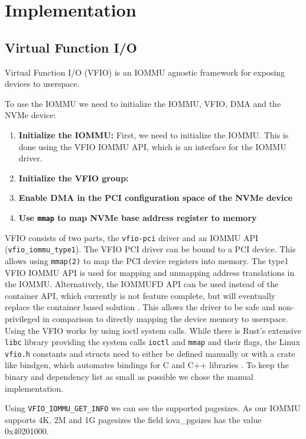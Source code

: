 \chapter{Implementation} \label{c:impl}

\section{Virtual Function I/O}
Virtual Function I/O (VFIO) is an IOMMU agnostic framework for exposing devices to userspace.

To use the IOMMU we need to initialize the IOMMU, VFIO, DMA and the NVMe device:
\begin{enumerate}
    \item \textbf{Initialize the IOMMU: } First, we need to initialize the IOMMU. This is done using the VFIO IOMMU API, which is an interface for the IOMMU driver. %
    \item \textbf{Initialize the VFIO group: }
    \item \textbf{Enable DMA in the PCI configuration space of the NVMe device}
    \item \textbf{Use \texttt{mmap} to map NVMe base address register to memory}
\end{enumerate}

VFIO consists of two parts, the \texttt{vfio-pci} driver and an IOMMU API (\texttt{vfio\_iommu\_type1}). The VFIO PCI driver can be bound to a PCI device. This allows using \texttt{mmap(2)} to map the PCI device registers into memory. The type1 VFIO IOMMU API is used for mapping and unmapping address translations in the IOMMU. Alternatively, the IOMMUFD API can be used instead of the container API, which currently is not feature complete, but will eventually replace the container based solution \cite{vfiokerneldocs}.
This allows the driver to be safe and non-privileged in comparison to directly mapping the device memory to userspace.
Using the VFIO works by using ioctl system calls.
While there is Rust's extensive \texttt{libc} library providing the system calls \texttt{ioctl} and \texttt{mmap} and their flags, the Linux \texttt{vfio.h} constants and structs need to either be defined manually or with a crate like bindgen, which automates bindings for C and C++ libraries \cite{cratebindgen}. To keep the binary and dependency list as small as possible we chose the manual implementation.

Using \texttt{VFIO\_IOMMU\_GET\_INFO} we can see the supported pagesizes. As our IOMMU supports 4K, 2M and 1G pagesizes the field iova\_pgsizes has the value 0x40201000.

